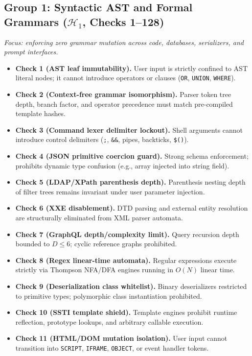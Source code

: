 \documentclass{portalciencia}
\theoremstyle{plain}
\theoremstyle{definition}
\begin{document}
\subsection{Group 1: Syntactic AST and Formal Grammars ($\mathcal{H}_1$, Checks 1--128)}

\emph{Focus: enforcing zero grammar mutation across code, databases, serializers, and prompt interfaces.}

\begin{itemize}
  \item \textbf{Check 1 (AST leaf immutability).} User input is strictly confined to AST literal nodes; it cannot introduce operators or clauses (\texttt{OR}, \texttt{UNION}, \texttt{WHERE}).
  \item \textbf{Check 2 (Context-free grammar isomorphism).} Parser token tree depth, branch factor, and operator precedence must match pre-compiled template hashes.
  \item \textbf{Check 3 (Command lexer delimiter lockout).} Shell arguments cannot introduce control delimiters (\texttt{;}, \texttt{\&\&}, pipes, backticks, \texttt{\$()}).
  \item \textbf{Check 4 (JSON primitive coercion guard).} Strong schema enforcement; prohibits dynamic type confusion (e.g., array injected into string field).
  \item \textbf{Check 5 (LDAP/XPath parenthesis depth).} Parenthesis nesting depth of filter trees remains invariant under user parameter injection.
  \item \textbf{Check 6 (XXE disablement).} DTD parsing and external entity resolution are structurally eliminated from XML parser automata.
  \item \textbf{Check 7 (GraphQL depth/complexity limit).} Query recursion depth bounded to $D \le 6$; cyclic reference graphs prohibited.
  \item \textbf{Check 8 (Regex linear-time automata).} Regular expressions execute strictly via Thompson NFA/DFA engines running in $O(N)$ linear time.
  \item \textbf{Check 9 (Deserialization class whitelist).} Binary deserializers restricted to primitive types; polymorphic class instantiation prohibited.
  \item \textbf{Check 10 (SSTI template shield).} Template engines prohibit runtime reflection, prototype lookups, and arbitrary callable execution.
  \item \textbf{Check 11 (HTML/DOM mutation isolation).} User input cannot transition into \texttt{SCRIPT}, \texttt{IFRAME}, \texttt{OBJECT}, or event handler tokens.

\end{itemize}
\end{document}
